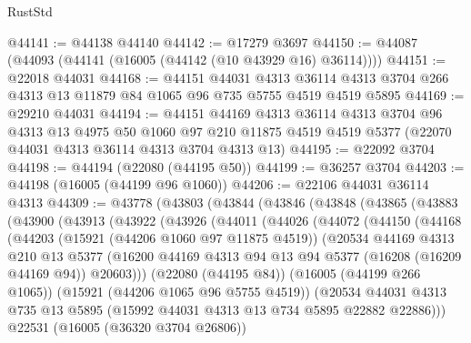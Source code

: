 \begin{lexlean}{RustStd}
\begin{coremodule}
@44141 := @44138 @44140
@44142 := @17279 @3697
@44150 := @44087 (@44093 (@44141 (@16005 (@44142 (@10 @43929 @16) @36114))))
@44151 := @22018 @44031
@44168 := @44151
    @44031
    @4313
    @36114
    @4313
    @3704
    @266
    @4313
    @13
    @11879
    @84
    @1065
    @96
    @735
    @5755
    @4519
    @4519
    @5895
@44169 := @29210 @44031
@44194 := @44151
    @44169
    @4313
    @36114
    @4313
    @3704
    @96
    @4313
    @13
    @4975
    @50
    @1060
    @97
    @210
    @11875
    @4519
    @4519
    @5377
    (@22070 @44031 @4313 @36114 @4313 @3704 @4313 @13)
@44195 := @22092 @3704
@44198 := @44194 (@22080 (@44195 @50))
@44199 := @36257 @3704
@44203 := @44198 (@16005 (@44199 @96 @1060))
@44206 := @22106 @44031 @36114 @4313
@44309 := @43778
    (@43803
      (@43844
        (@43846
          (@43848
            (@43865
              (@43883
                (@43900
                  (@43913
                    (@43922
                      (@43926
                        (@44011
                          (@44026
                            (@44072
                              (@44150
                                (@44168
                                  (@44203
                                    (@15921 (@44206 @1060 @97 @11875 @4519))
                                    (@20534
                                      @44169
                                      @4313
                                      @210
                                      @13
                                      @5377
                                      (@16200
                                        @44169
                                        @4313
                                        @94
                                        @13
                                        @94
                                        @5377
                                        (@16208 (@16209 @44169 @94))
                                        @20603)))
                                  (@22080 (@44195 @84))
                                  (@16005 (@44199 @266 @1065))
                                  (@15921 (@44206 @1065 @96 @5755 @4519))
                                  (@20534
                                    @44031
                                    @4313
                                    @735
                                    @13
                                    @5895
                                    (@15992 @44031 @4313 @13 @734 @5895 @22882 @22886)))
                                @22531
                                (@16005 (@36320 @3704 @26806))

\end{coremodule}
\end{lexlean}
